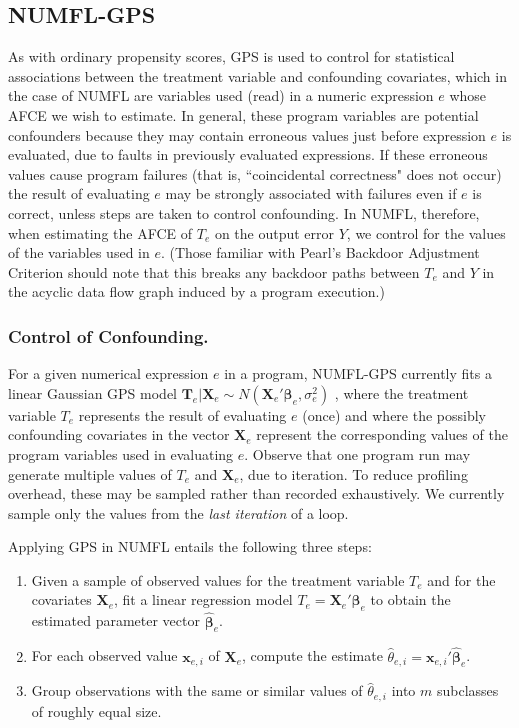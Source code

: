 \subsection{NUMFL-GPS}\label{IVA}
As with ordinary propensity scores, GPS is used to control for statistical associations between the treatment variable and confounding covariates, which in the case of NUMFL are variables used (read) in a numeric expression $e$ whose AFCE we wish to estimate. In general, these program variables are potential confounders because they may contain erroneous values just before expression $e$ is evaluated, due to faults in previously evaluated expressions. If these erroneous values cause program failures (that is, ``coincidental correctness" does not occur) the result of evaluating $e$ may be strongly associated with failures even if $e$ is correct, unless steps are taken to control confounding. In NUMFL, therefore, when estimating the AFCE of $T_e$ on the output error $Y$, we control for the values of the variables used in $e$.  (Those familiar with Pearl's Backdoor Adjustment Criterion \cite{Pearl2003} should note that this breaks any backdoor paths between $T_e$ and $Y$ in the acyclic data flow graph induced by a program execution.)

\subsubsection{Control of Confounding.}
For a given numerical expression $e$ in a program, NUMFL-GPS currently fits a linear
Gaussian GPS model ${{\pmb T}_e}|{{\pmb X}_e} \sim N({\pmb X}_e'{{\pmb \beta} _e}, \sigma _e^2)$ , where the treatment variable $T_e$ represents the result of evaluating $e$ (once) and where the possibly confounding covariates in the vector $\pmb{X}_e$ represent the corresponding values of the program variables used in evaluating $e$. Observe that one program run may generate multiple values of $T_e$ and $\pmb{X}_e$, due to iteration. To reduce profiling overhead, these may be sampled rather than recorded exhaustively. We currently sample only the values from the {\it last iteration} of a loop.

Applying GPS in NUMFL entails the following three steps:
\begin{enumerate}
\item 	Given a sample of observed values for the treatment variable $T_e$ and for the covariates $\pmb{X}_e$, fit a linear regression model $T_e=\pmb{X}_e' \pmb{\beta}_e$ to obtain the estimated parameter vector $\hat {\pmb{\beta}}_e$.
\item For each observed value ${\pmb x}_{e,i}$ of $\pmb{X}_e$, compute the estimate ${{\hat \theta }_{e,i}} = {\pmb{x}_{e,i}}'{{\hat {\pmb{\beta}} }_e}$.
\item Group observations with the same or similar values of $\hat{\theta}_{e,i}$ into $m$ subclasses of roughly equal size.
\end{enumerate}

